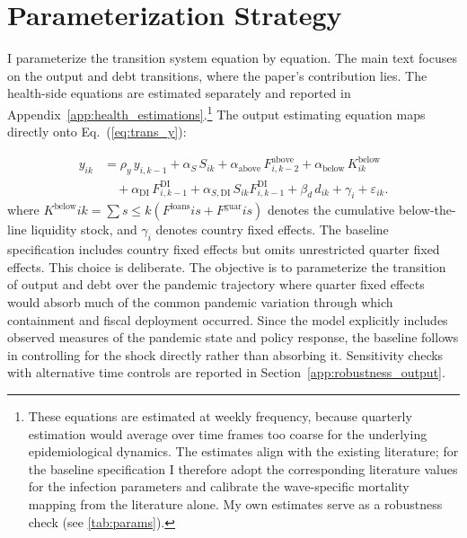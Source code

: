 \documentclass[12pt, a4paper]{article}
\begin{document}
\section{Parameterization Strategy}
\label{sec:estimation}

I parameterize the transition system equation by equation. The main text focuses on the output and debt transitions, where the paper's contribution lies. The health-side equations are estimated separately and reported in Appendix~\ref{app:health_estimations}.\footnote{\label{fn:weekly}These equations are estimated at weekly frequency, because quarterly estimation would average over time frames too coarse for the underlying epidemiological dynamics. The estimates align with the existing literature; for the baseline specification I therefore adopt the corresponding literature values for the infection parameters and calibrate the wave-specific mortality mapping from the literature alone. My own estimates serve as a robustness check (see \ref{tab:params}).} The output estimating equation maps directly onto Eq.~(\ref{eq:trans_y}):

%
\begin{equation}
\begin{aligned}
    y_{ik} &= \rho_y\, y_{i,k-1}
    + \alpha_S\, S_{ik}
    + \alpha_{\text{above}}\, F^{\text{above}}_{i,k-2}
    + \alpha_{\text{below}}\, K^{\text{below}}_{ik} \\
    &\quad
    + \alpha_{\text{DI}}\, F^{\text{DI}}_{i,k-1}
    + \alpha_{S,\text{DI}}\, S_{ik} F^{\text{DI}}_{i,k-1}
    + \beta_d\, d_{ik}
    + \gamma_i + \varepsilon_{ik}.
\end{aligned}
\label{eq:output_est}
\end{equation}
%
where $K^{\text{below}}{ik}=\sum{s\leq k}
\left(F^{\text{loans}}{is}+F^{\text{guar}}{is}\right)$ denotes the cumulative below-the-line liquidity stock, and $\gamma_i$ denotes country fixed effects. The baseline specification includes country fixed effects but omits unrestricted quarter fixed effects. This choice is deliberate. The objective is to parameterize the transition of output and debt over the pandemic trajectory where quarter fixed effects would absorb much of the common pandemic variation through which containment and fiscal deployment occurred. Since the model explicitly includes observed measures of the pandemic state and policy response, the baseline follows \citet{deb2021} in controlling for the shock directly rather than absorbing it. Sensitivity checks with alternative time controls are reported in Section~\ref{app:robustness_output}.
\end{document}
